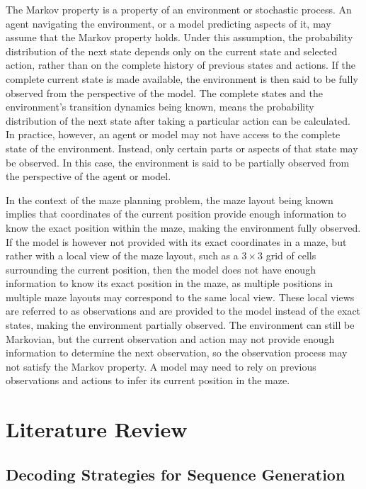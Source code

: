 ﻿\documentclass[12pt,a4paper]{article}
\theoremstyle{definition}
\begin{document}
The Markov property is a property of an environment or stochastic process. An agent navigating the 
environment, or a model predicting aspects of it, may assume that the Markov property holds. 
Under this assumption, the probability distribution of the next state depends only on the 
current state and selected action, rather than on the complete history of previous states and 
actions. If the complete current state is made available, the environment is then said to be 
fully observed from the perspective of the model. The complete states and the environment’s transition dynamics being known, means
the probability distribution of the next state after taking a particular action can be calculated. 
In practice, 
however, an agent or model may not have access to the complete state of the environment. Instead, only
certain parts or aspects of that state may be observed. In this case, the environment is said to be
partially observed from the perspective of the agent or model.

In the context of the maze planning problem, the maze layout being known implies that 
coordinates of the current position provide
enough information to know the exact position within the maze, making the environment fully
observed. If the
model is however not provided with its exact coordinates in a maze,
but rather with a local view of the maze layout, such as a $3 \times 3$ grid of cells 
surrounding the current position, then the model does not have enough information 
to know its exact position in the maze, as multiple positions in multiple maze 
layouts may correspond to the same local view. These local views
are referred to as observations 
and are provided to the model instead of the exact states, making the environment partially observed.
The environment can still be Markovian, but the current observation and action may not 
provide enough information to determine the next observation, so the observation 
process may not satisfy the Markov property. A model may need to rely on 
previous observations and actions to infer its current position in the maze.

\section{Literature Review}


\subsection{Decoding Strategies for Sequence Generation}
\end{document}
